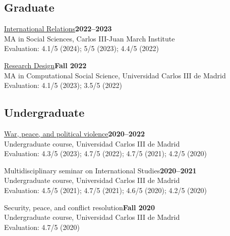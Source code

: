 \documentclass[a4paper, 12pt]{article}
\begin{document}
\subsection*{Graduate}

\noindent
\href{https://raw.githack.com/franvillamil/syllabi/master/current/syllabus_IR.pdf}{International Relations}\hfill\textbf{2022--2023}\\
{\small MA in Social Sciences, Carlos III-Juan March Institute}\\
{\small Evaluation: 4.1/5 (2024); 5/5 (2023); 4.4/5 (2022)}
\vspace{10pt}

\noindent
\href{https://github.com/franvillamil/syllabi/blob/master/current/syllabus_research_design.pdf}{Research Design}\hfill\textbf{Fall 2022}\\
{\small MA in Computational Social Science, Universidad Carlos III de Madrid}\\
{\small Evaluation: 4.1/5 (2023); 3.5/5 (2022)}

\subsection*{Undergraduate}

\noindent
\href{https://github.com/franvillamil/syllabi/blob/master/current/syllabus_war_peace_political_violence.pdf}{War, peace, and political violence}\hfill\textbf{2020--2022}\\
{\small Undergraduate course, Universidad Carlos III de Madrid}\\
{\small Evaluation: 4.3/5 (2023); 4.7/5 (2022); 4.7/5 (2021); 4.2/5 (2020)}
\vspace{10pt}

\noindent
Multidisciplinary seminar on International Studies\hfill\textbf{2020--2021}\\
{\small Undergraduate course, Universidad Carlos III de Madrid}\\
{\small Evaluation: 4.5/5 (2021); 4.7/5 (2021); 4.6/5 (2020); 4.2/5 (2020)}
\vspace{10pt}

\noindent
Security, peace, and conflict resolution\hfill\textbf{Fall 2020}\\
{\small Undergraduate course, Universidad Carlos III de Madrid}\\
{\small Evaluation: 4.7/5 (2020)}

\end{document}
